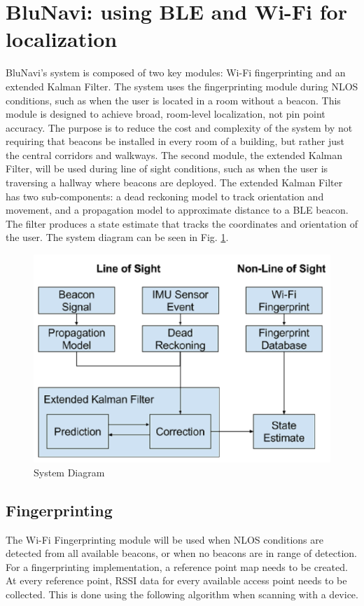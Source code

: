 \documentclass[conference]{IEEEtran}
\begin{document}
\section{BluNavi: using BLE and Wi-Fi for localization}

BluNavi's system is composed of two key modules: Wi-Fi fingerprinting and an extended Kalman Filter. The system uses the fingerprinting module during NLOS conditions, such as when the user is located in a room without a beacon. This module is designed to achieve broad, room-level localization, not pin point accuracy. The purpose is to reduce the cost and complexity of the system by not requiring that beacons be installed in every room of a building, but rather just the central corridors and walkways. The second module, the extended Kalman Filter, will be used during line of sight conditions, such as when the user is traversing a hallway where beacons are deployed. The extended Kalman Filter has two sub-components: a dead reckoning model to track orientation and movement, and a propagation model to approximate distance to a BLE beacon. The filter produces a state estimate that tracks the coordinates and orientation of the user. The system diagram can be seen in Fig. \ref{fig:sysdiagram}.

\begin{figure}[h]
\centering
\includegraphics[scale=0.25]{SystemDiagram.png}
\caption{System Diagram}
\captionsetup{justification=centering,margin=2cm}
\label{fig:sysdiagram}
\end{figure}


\subsection{Fingerprinting}
The Wi-Fi Fingerprinting module will be used when NLOS conditions are detected from all available beacons, or when no beacons are in range of detection.
For a fingerprinting implementation, a reference point map needs to be created. At every reference point, RSSI data for every available access point needs to be collected. This is done using the following algorithm when scanning with a device.
\end{document}
